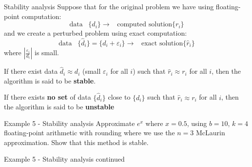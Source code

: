 \documentclass[12pt]{beamer}
\begin{document}
\begin{frame}{Stability analysis} 
Suppose that for the original problem we have using floating-point computation: 
\[
\mbox{data} \;\;\; \{d_i\} \rightarrow  \;\;\; \mbox{computed solution} \{r_i\}
\] 
and we create a perturbed problem using exact computation: 
\[ 
\mbox{data} \;\;\; \{\hat d_i\} = \{d_i+\varepsilon_i\} \rightarrow \;\;\; \mbox{exact solution} \{\hat r_i\}
\]
\noindent 
where $|\frac{\varepsilon_i}{d_i}|$ is small. 

If there exist data $\hat d_i \approx d_i$ (small $\varepsilon_i$ for all $i$) such that $\hat r_i \approx r_i$ for all $i$, then the algorithm is said to be {\bf stable}. 

If there exists {\bf no set} of data $\{ \hat d_i\}$ close to $\{ d_i \}$ such that $\hat r_i \approx r_i$ for all $i$, then the algorithm is said to be {\bf unstable} 
\end{frame} 

\begin{frame}{Example 5 - Stability analysis}
Approximate $e^x$ where $x=0.5$, using $b=10$, $k=4$ floating-point arithmetic with rounding where we use the $n=3$ McLaurin approximation. Show that this method is stable.
\vspace{3 in}
\end{frame}  

\begin{frame}{Example 5 - Stability analysis continued}

\end{frame}  
\end{document}
